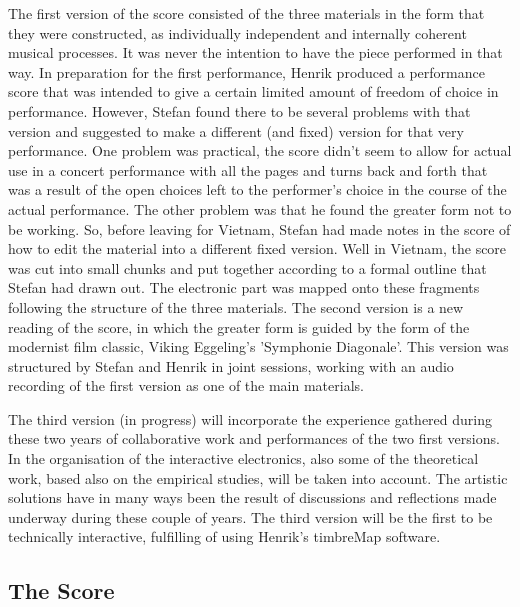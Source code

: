 The first version of the score consisted of the three materials in the
form that they were constructed, as individually independent and
internally coherent musical processes. It was never the intention to
have the piece performed in that way. In preparation for the first
performance, Henrik produced a performance score that was intended to
give a certain limited amount of freedom of choice in
performance. However, Stefan found there to be several problems with
that version and suggested to make a different (and fixed) version for
that very performance. One problem was practical, the score didn't
seem to allow for actual use in a concert performance with all the
pages and turns back and forth that was a result of the open choices
left to the performer's choice in the course of the actual
performance. The other problem was that he found the greater form not
to be working. So, before leaving for Vietnam, Stefan had made notes
in the score of how to edit the material into a different fixed
version. Well in Vietnam, the score was cut into small chunks and put
together according to a formal outline that Stefan had drawn out. The
electronic part was mapped onto these fragments following the
structure of the three materials.  The second version is a new reading
of the score, in which the greater form is guided by the form of the
modernist film classic, Viking Eggeling's 'Symphonie Diagonale'. This
version was structured by Stefan and Henrik in joint sessions, working
with an audio recording of the first version as one of the main
materials.
 

The third version (in progress) will incorporate the experience
gathered during these two years of collaborative work and performances
of the two first versions. In the organisation of the interactive
electronics, also some of the theoretical work, based also on the
empirical studies, will be taken into account. The artistic solutions
have in many ways been the result of discussions and reflections made
underway during these couple of years. The third version will be the
first to be technically interactive, fulfilling of using Henrik's
timbreMap software.
 
\subsection{The Score }
\label{sec:score-}


